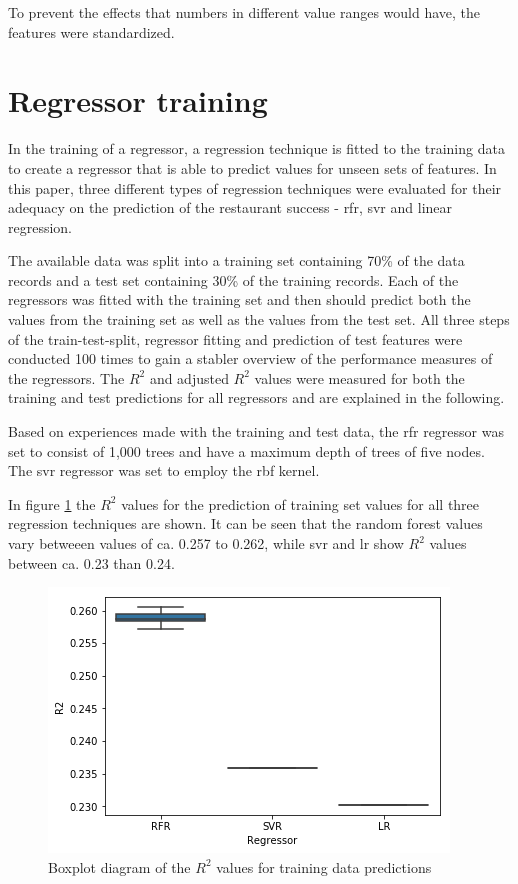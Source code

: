 \documentclass[a4paper, 11pt, oneside]{Thesis}  %
\begin{document}
To prevent the effects that numbers in different value ranges would have, the features were standardized.

\section{Regressor training}
\label{regressor_training}

In the training of a regressor, a regression technique is fitted to the training data to create a regressor that is able to predict values for unseen sets of features. In this paper, three different types of regression techniques were evaluated for their adequacy on the prediction of the restaurant success - \ac{rfr}, \ac{svr} and linear regression.

The available data was split into a training set containing 70\% of the data records and a test set containing 30\% of the training records. Each of the regressors was fitted with the training set and then should predict both the values from the training set as well as the values from the test set. All three steps of the train-test-split, regressor fitting and prediction of test features were conducted 100 times to gain a stabler overview of the performance measures of the regressors. The $R^2$ and adjusted $R^2$ values were measured for both the training and test predictions for all regressors and are explained in the following.

Based on experiences made with the training and test data, the \ac{rfr} regressor was set to consist of 1,000 trees and have a maximum depth of trees of five nodes. The \ac{svr} regressor was set to employ the \ac{rbf} kernel.

In figure \ref{fig:boxplot_r2_training_data} the $R^2$ values for the prediction of training set values for all three regression techniques are shown. It can be seen that the random forest values vary betweeen values of ca. 0.257 to 0.262, while \ac{svr} and \ac{lr} show $R^2$ values between ca. 0.23 than 0.24.

\begin{figure}[h]
\includegraphics[scale=0.7]{Figures/Regressor_comparison/boxplot_r2_training_data.png}
\centering
\caption{Boxplot diagram of the $R^2$ values for training data predictions}
\label{fig:boxplot_r2_training_data}
\end{figure}
\end{document}

